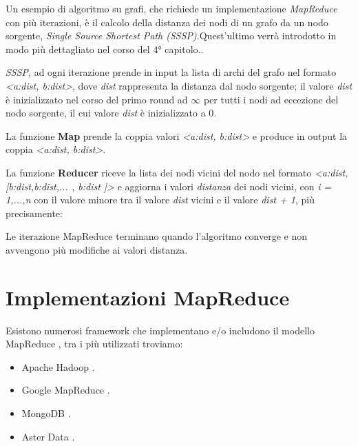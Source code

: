 \documentclass[LaM,binding=0.6cm]{sapthesis}
\begin{document}
Un esempio di algoritmo  su grafi, che richiede un implementazione \textit{MapReduce} con più iterazioni, è il calcolo della distanza dei nodi di un grafo da un nodo sorgente, \textit{Single Source Shortest Path (SSSP)}.Quest'ultimo verrà introdotto in modo più dettagliato nel corso del 4° capitolo..

\textit{SSSP}, ad ogni iterazione prende in input la lista di archi del grafo nel formato \textit{<a:dist, b:dist>}, dove \textit{dist} rappresenta la distanza dal nodo sorgente; il valore \textit{dist} è inizializzato nel corso del primo round ad $\infty$ per tutti i nodi ad eccezione del nodo sorgente, il cui valore \textit{dist} è inizializzato a 0.

La funzione \textbf{Map} prende la coppia valori 
\textit{<a:dist, b:dist>}
e produce in output la coppia 
 \textit{<a:dist, b:dist>}.
 
La funzione \textbf{Reducer} riceve la lista dei nodi vicini del nodo nel formato 
\textit{<a:dist, [b:dist,b:dist,... , b:dist ]>}
e aggiorna i valori\textit{ distanza} dei nodi vicini, con \textit{i = 1,...,n} con il valore minore tra il valore \textit{dist} vicini e il valore \textit{dist + 1}, più precisamente:

\begin{minipage}{\linewidth}
		
\end{minipage}

Le iterazione MapReduce terminano quando l'algoritmo converge e non avvengono più modifiche ai valori distanza.

\section{Implementazioni MapReduce}


Esistono numerosi framework che implementano e/o includono il modello MapReduce \cite{Dean:2008:MSD:1327452.1327492}, tra i più utilizzati troviamo: 
\begin{itemize}
\item Apache Hadoop \cite{1_hadoop.apache.org_2015}.
\item Google MapReduce \cite{Dean:2008:MSD:1327452.1327492}.
\item MongoDB \cite{2_mongodb.org_2015}.
\item Aster Data \cite{3_it.teradata.com_2015}.
\end{itemize}
\end{document}

